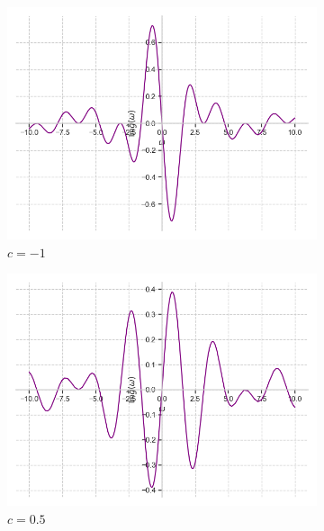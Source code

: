 \documentclass[a4paper, 16pt]{article}
\begin{document}
    \begin{figure}[htbp]
        \centering
        \begin{subfigure}{0.3\textwidth}
            \centering
            \includegraphics[width=\linewidth]{sh_m1_im_rectf_int12.png}
            \caption{$c=-1$}
            \label{fig:imshrectf_1}
        \end{subfigure}
        \hfill
        \begin{subfigure}{0.3\textwidth}
            \centering
            \includegraphics[width=\linewidth]{sh_zp5_im_rectf_int12.png}
            \caption{$c=0.5$}
            \label{fig:imshrectf_2}
        \end{subfigure}
        \hfill
        \begin{subfigure}{0.3\textwidth}

\end{subfigure}
\end{figure}
\end{document}

